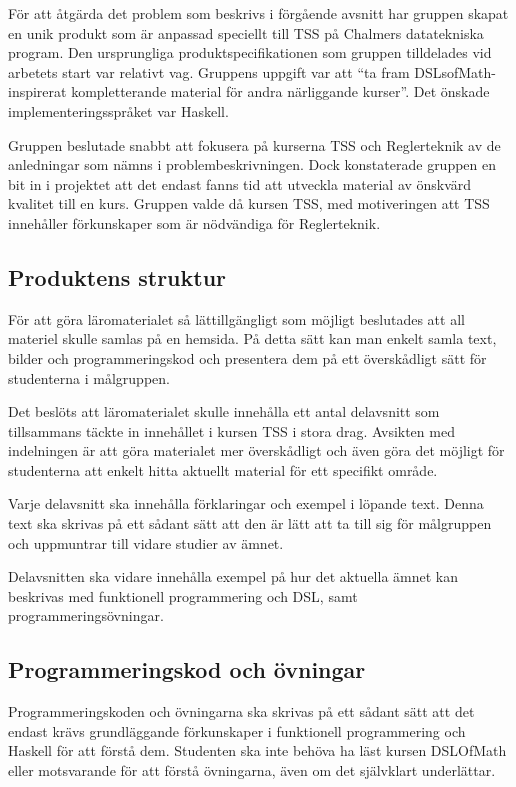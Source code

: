 \documentclass[]{article}
\begin{document}

För att åtgärda det problem som beskrivs i förgående avsnitt har gruppen skapat
en unik produkt som är anpassad speciellt till TSS på Chalmers datatekniska
program. Den ursprungliga produktspecifikationen som gruppen tilldelades vid
arbetets start var relativt vag. Gruppens uppgift var att ``ta fram
DSLsofMath-inspirerat kompletterande material för andra närliggande kurser''.
Det önskade implementeringsspråket var Haskell.

Gruppen beslutade snabbt att fokusera på kurserna TSS och Reglerteknik av de
anledningar som nämns i problembeskrivningen. Dock konstaterade gruppen en bit
in i projektet att det endast fanns tid att utveckla material av önskvärd
kvalitet till en kurs. Gruppen valde då kursen TSS, med motiveringen att
TSS innehåller förkunskaper som är nödvändiga för Reglerteknik.

\subsection{Produktens struktur}
För att göra läromaterialet så lättillgängligt som möjligt beslutades att
all materiel skulle samlas på en hemsida. På detta sätt kan man enkelt
samla text, bilder och programmeringskod och presentera dem på ett
överskådligt sätt för studenterna i målgruppen.

Det beslöts att läromaterialet skulle innehålla ett antal delavsnitt som
tillsammans täckte in innehållet i kursen TSS i stora drag.
Avsikten med indelningen är att göra materialet mer överskådligt och
även göra det möjligt för studenterna att enkelt hitta aktuellt material
för ett specifikt område.

Varje delavsnitt ska innehålla förklaringar och exempel i löpande text.
Denna text ska skrivas på ett sådant sätt att den är lätt att ta till
sig för målgruppen och uppmuntrar till vidare studier av ämnet.

Delavsnitten ska vidare innehålla exempel på hur det aktuella ämnet kan
beskrivas med funktionell programmering och DSL, samt programmeringsövningar.

\subsection{Programmeringskod och övningar}

Programmeringskoden och övningarna ska skrivas på ett sådant sätt att det endast krävs grundläggande förkunskaper i 
funktionell programmering och Haskell för att förstå dem. Studenten ska inte behöva ha läst kursen DSLOfMath eller 
motsvarande för att förstå övningarna, även om det självklart underlättar. 
\end{document}

